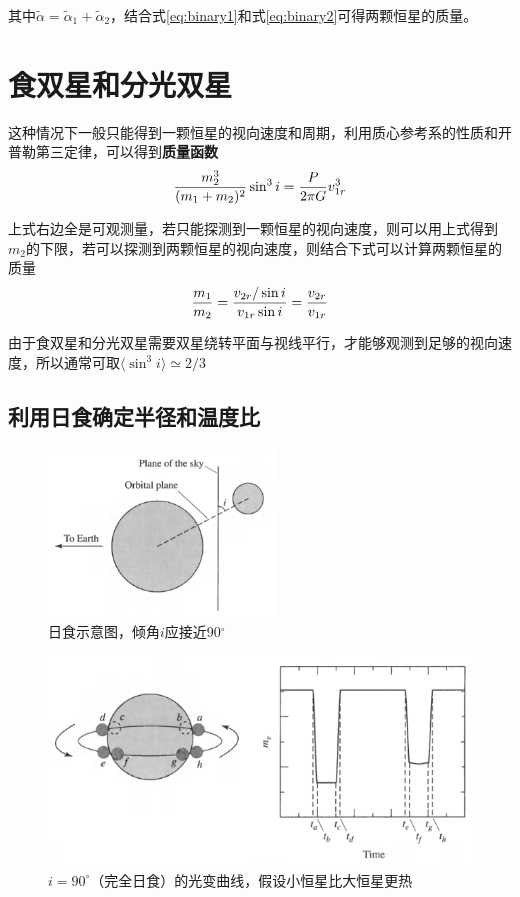 其中$\widetilde \alpha=\widetilde \alpha_1+\widetilde \alpha_2$，结合式\ref{eq:binary1}和式\ref{eq:binary2}可得两颗恒星的质量。

\section{食双星和分光双星}
这种情况下一般只能得到一颗恒星的视向速度和周期，利用质心参考系的性质和开普勒第三定律，可以得到\textbf{质量函数}
\begin{equation}
  {m^3_2\over (m_1+m_2)^2}\sin^3 i={P\over 2\pi G}v^3_{1r}
\end{equation}

上式右边全是可观测量，若只能探测到一颗恒星的视向速度，则可以用上式得到$m_2$的下限，若可以探测到两颗恒星的视向速度，则结合下式可以计算两颗恒星的质量
\begin{equation}
  {m_1\over m_2}={v_{2r}/ \sin{i}\over v_{1r}\sin{i}}={v_{2r} \over v_{1r}}
\end{equation}

由于食双星和分光双星需要双星绕转平面与视线平行，才能够观测到足够的视向速度，所以通常可取$\langle\sin^3 i\rangle\simeq2/3$

\subsection{利用日食确定半径和温度比}
\begin{figure}[hbt]
  \centering
  \includegraphics[width=6cm]{chapters/07/eclipse1}
  \caption{日食示意图，倾角$i$应接近90$^\circ$}
  \label{}
\end{figure}

\begin{figure}[hbt]
  \centering
  \includegraphics[width=12cm]{chapters/07/eclipse2}
  \caption{$i=90^\circ$（完全日食）的光变曲线，假设小恒星比大恒星更热}
  \label{}
\end{figure}

